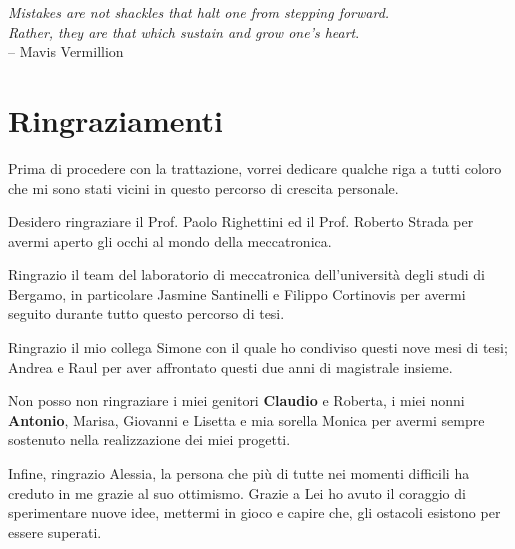 \begin{flushright}

    \par   %
    \vspace{2\baselineskip}
    \textit{Mistakes are not shackles that halt one from stepping forward. \\Rather, they are that which sustain and grow one’s heart}. \\– Mavis Vermillion


\end{flushright}
\vfill
\section*{Ringraziamenti}
Prima di procedere con la trattazione, vorrei dedicare qualche riga a tutti coloro che mi sono stati vicini in questo percorso di crescita personale.
\par Desidero ringraziare il Prof. Paolo Righettini ed il Prof. Roberto Strada per avermi aperto gli occhi al mondo della meccatronica.
\par Ringrazio il team del laboratorio di meccatronica dell'università degli studi di Bergamo, in particolare Jasmine Santinelli e Filippo Cortinovis per avermi seguito durante tutto questo percorso di tesi.
\par Ringrazio il mio collega Simone con il quale ho condiviso questi nove mesi di tesi; Andrea e Raul per aver affrontato questi due anni di magistrale insieme.
\par Non posso non ringraziare i miei genitori \textbf{Claudio} e Roberta, i miei nonni \textbf{Antonio}, Marisa, Giovanni e Lisetta e mia sorella Monica per avermi sempre sostenuto nella realizzazione dei miei progetti.
\par Infine, ringrazio Alessia, la persona che più di tutte nei momenti difficili ha creduto in me grazie al suo ottimismo. Grazie a Lei ho avuto il coraggio di sperimentare nuove idee, mettermi in gioco e capire che, gli ostacoli esistono per essere superati.